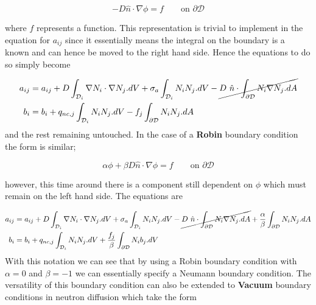 \documentclass[11pt,letterpaper,titlepage]{article}
\newcommand{\bOmega}{\mathcal{D}}
\numberwithin{equation}{section}
\begin{document}
\begin{equation*}
-D \hat{n} \cdot \nabla \phi = f \quad \quad \text{on } \partial \bOmega
\end{equation*}

where $f$ represents a function. This representation is trivial to implement in the equation for $a_{ij}$ since it essentially means the integral on the boundary is a known and can hence be moved to the right hand side. Hence the equations to do so simply become

\begin{equation*}
\begin{aligned}
a_{ij} &=a_{ij} +  D \int_{\bOmega_i} \nabla N_i  \cdot  \nabla N_j .dV + 
\sigma_a \int_{\bOmega_i} N_i N_j.dV - \cancel{
D \  \hat{n} \cdot \int_{\partial \bOmega} N_i  \nabla N_j .dA} \\
b_i &= b_i 
+ q_{nc,j} \int_{\bOmega_i}  N_i  N_j .dV - f_j \int_{\partial\bOmega}  N_i  N_j .dA
\end{aligned}
\end{equation*}
and the rest remaining untouched.
\newline
\newline
In the case of a \textbf{Robin} boundary condition the form is similar;

\begin{equation*}
\alpha \phi+\beta D \hat{n} \cdot \nabla \phi = f \quad \quad \text{on } \partial \bOmega
\end{equation*}

however, this time around there is a component still dependent on $\phi$ which must remain on the left hand side. The equations are

\begin{equation*}
\begin{aligned}
a_{ij} &=a_{ij} +  D \int_{\bOmega_i} \nabla N_i  \cdot  \nabla N_j .dV + 
\sigma_a \int_{\bOmega_i} N_i N_j.dV - \cancel{
D \  \hat{n} \cdot \int_{\partial \bOmega} N_i  \nabla N_j .dA} 
+ 
\frac{\alpha}{\beta} \int_{\partial\bOmega} N_i N_j.dA\\
b_i &= b_i 
+ q_{nc,j} \int_{\bOmega_i}  N_i  N_j .dV + \frac{f_j}{\beta} \int_{\partial\bOmega}  N_i  b_j .dV
\end{aligned}
\end{equation*}
\newline
With this notation we can see that by using a Robin boundary condition with $\alpha=0$ and $\beta=-1$ we can essentially specify a Neumann boundary condition.
\newline
\newline
The versatility of this boundary condition can also be extended to \textbf{Vacuum} boundary conditions in neutron diffusion which take the form
\end{document}
